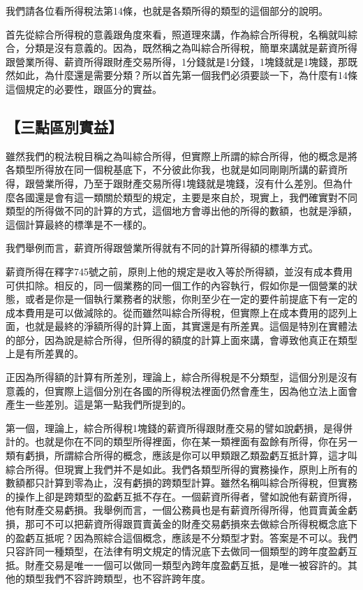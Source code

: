 \documentclass[]{ctexbook}
\begin{document}
我們請各位看所得稅法第14條，也就是各類所得的類型的這個部分的說明。

首先從綜合所得稅的意義跟角度來看，照道理來講，作為綜合所得稅，名稱就叫綜合，分類是沒有意義的。因為，既然稱之為叫綜合所得稅，簡單來講就是薪資所得跟營業所得、薪資所得跟財產交易所得，1分錢就是1分錢，1塊錢就是1塊錢，那既然如此，為什麼還是需要分類？所以首先第一個我們必須要談一下，為什麼有14條這個規定的必要性，跟區分的實益。

\hypertarget{ux4e09ux9edeux5340ux5225ux5be6ux76ca}{%
\subsection{【三點區別實益】}\label{ux4e09ux9edeux5340ux5225ux5be6ux76ca}}

雖然我們的稅法稅目稱之為叫綜合所得，但實際上所謂的綜合所得，他的概念是將各類型所得放在同一個稅基底下，不分彼此你我，也就是如同剛剛所講的薪資所得，跟營業所得，乃至于跟財產交易所得1塊錢就是塊錢，沒有什么差別。但為什麼各國還是會有這一類關於類型的規定，主要是來自於，現實上，我們確實對不同類型的所得做不同的計算的方式，這個地方會導出他的所得的數額，也就是淨額，這個計算最終的標準是不一樣的。

我們舉例而言，薪資所得跟營業所得就有不同的計算所得額的標準方式。

薪資所得在釋字745號之前，原則上他的規定是收入等於所得額，並沒有成本費用可供扣除。相反的，同一個業務的同一個工作的內容執行，假如你是一個營業的狀態，或者是你是一個執行業務者的狀態，你則至少在一定的要件前提底下有一定的成本費用是可以做減除的。從而雖然叫綜合所得稅，但實際上在成本費用的認列上面，也就是最終的淨額所得的計算上面，其實還是有所差異。這個是特別在實體法的部分，因為說是綜合所得，但所得的額度的計算上面來講，會導致他真正在類型上是有所差異的。

正因為所得額的計算有所差別，理論上，綜合所得稅是不分類型，這個分別是沒有意義的，但實際上這個分別在各國的所得稅法裡面仍然會產生，因為他立法上面會產生一些差別。這是第一點我們所提到的。

第一個，理論上，綜合所得稅1塊錢的薪資所得跟財產交易的譬如說虧損，是得併計的。也就是你在不同的類型所得裡面，你在某一類裡面有盈餘有所得，你在另一類有虧損，所謂綜合所得的概念，應該是你可以甲類跟乙類盈虧互抵計算，這才叫綜合所得。但現實上我們并不是如此。我們各類型所得的實務操作，原則上所有的數額都只計算到零為止，沒有虧損的跨類型計算。雖然名稱叫綜合所得稅，但實務的操作上卻是跨類型的盈虧互抵不存在。一個薪資所得者，譬如說他有薪資所得，他有財產交易虧損。我舉例而言，一個公務員也是有薪資所得所得，他買賣黃金虧損，那可不可以把薪資所得跟買賣黃金的財產交易虧損來去做綜合所得稅概念底下的盈虧互抵呢？因為照綜合這個概念，應該是不分類型才對。答案是不可以。我們只容許同一種類型，在法律有明文規定的情況底下去做同一個類型的跨年度盈虧互抵。財產交易是唯一一個可以做同一類型內跨年度盈虧互抵，是唯一被容許的。其他的類型我們不容許跨類型，也不容許跨年度。
\end{document}
